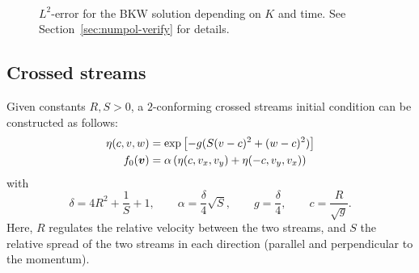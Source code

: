 \begin{figure}
\centering
{} \\
\caption{$L^2$-error for the BKW solution depending on $K$ and time. See Section~\vref{sec:numpol-verify} for
details.}
\label{fig:numpol-bkw}
\end{figure}

\subsection{Crossed streams} \label{sec:numpol-cb}

Given constants $R,S>0$, a $2$-conforming crossed streams initial condition can be constructed as follows:
\begin{align*}
    \eta(c,v,w) &= \exp\left[-g(S(v-c)^2 + (w-c)^2)\right] \\
    f_0({\bm v}) &= \alpha\left( \eta(c,v_x,v_y) + \eta(-c,v_y,v_x) \right)
\end{align*}
with
\[
    \delta = 4R^2+\frac{1}{S}+1, \qquad
    \alpha = \frac{\delta}{4}\sqrt{S}, \qquad
    g = \frac{\delta}{4}, \qquad
    c = \frac{R}{\sqrt{g}}.
\]
Here, $R$ regulates the relative velocity between the two streams, and $S$ the relative spread of the two
streams in each direction (parallel and perpendicular to the momentum).

